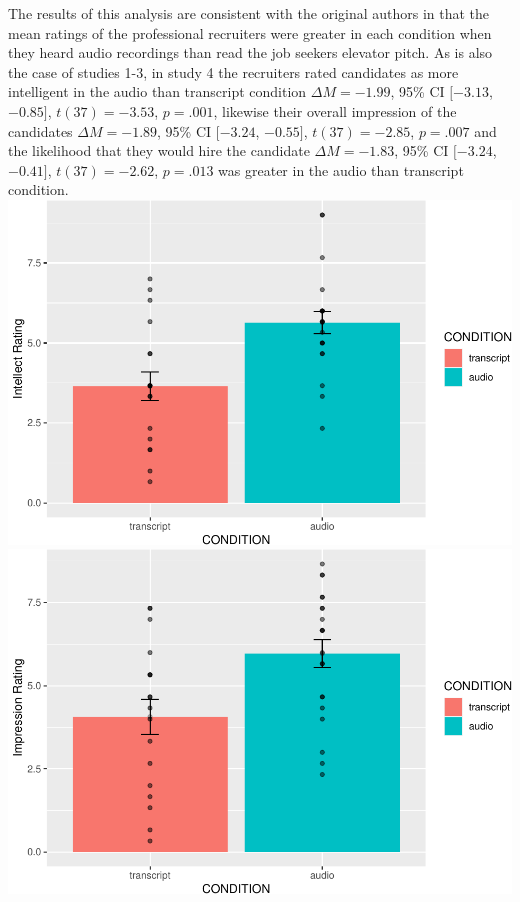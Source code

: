 \documentclass[
  english,
  man]{apa6}
\begin{document}
The results of this analysis are consistent with the original authors in that the mean ratings of the professional recruiters were greater in each condition when they heard audio recordings than read the job seekers elevator pitch. As is also the case of studies 1-3, in study 4 the recruiters rated candidates as more intelligent in the audio than transcript condition \(\Delta M = -1.99\), 95\% CI \([-3.13\), \(-0.85]\), \(t(37) = -3.53\), \(p = .001\), likewise their overall impression of the candidates \(\Delta M = -1.89\), 95\% CI \([-3.24\), \(-0.55]\), \(t(37) = -2.85\), \(p = .007\) and the likelihood that they would hire the candidate \(\Delta M = -1.83\), 95\% CI \([-3.24\), \(-0.41]\), \(t(37) = -2.62\), \(p = .013\) was greater in the audio than transcript condition.
\includegraphics{CSF-semester-project_files/figure-latex/unnamed-chunk-3-1.pdf}
\includegraphics{CSF-semester-project_files/figure-latex/unnamed-chunk-4-1.pdf}
\end{document}
